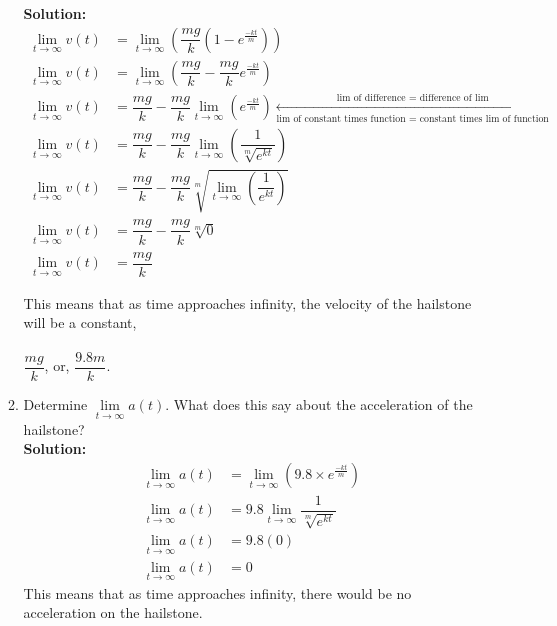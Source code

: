 \documentclass[12pt]{book}
\begin{document}
\begin{enumerate}
\begin{enumerate}
\textbf{Solution:}
\setcounter{equation}{0}
\begingroup
\addtolength{\jot}{0.5em}
\begin{align}
    \lim\limits_{t\to \infty} v(t) &= \lim\limits_{t\to \infty} \left(\dfrac{mg}{k} (1 - e^{\frac{-kt}{m}}) \right) \\
    \lim\limits_{t\to \infty} v(t) &= \lim\limits_{t\to \infty} \left( \dfrac{mg}{k} - \dfrac{mg}{k}e^{\frac{-kt}{m}} \right)\\
    \lim\limits_{t\to \infty} v(t) &=  \dfrac{mg}{k} - \dfrac{mg}{k} \lim\limits_{t\to \infty} \left(e^{\frac{-kt}{m}} \right) \xleftarrow[\text{lim of constant times function = constant times lim of function}]{\text{lim of difference = difference of lim}} \\
    \lim\limits_{t\to \infty} v(t) &=  \dfrac{mg}{k} - \dfrac{mg}{k} \lim\limits_{t\to \infty} \left(\dfrac{1}{\sqrt[m]{e^{kt}}} \right) \\
    \lim\limits_{t\to \infty} v(t) &=  \dfrac{mg}{k} - \dfrac{mg}{k} \sqrt[m]{ \lim\limits_{t\to \infty} \left(\dfrac{1}{e^{kt}} \right)  } \\
    \lim\limits_{t\to \infty} v(t) &=  \dfrac{mg}{k} - \dfrac{mg}{k} \sqrt[m]{0  } \\
    \lim\limits_{t\to \infty} v(t) &=  \dfrac{mg}{k}
\end{align}
\endgroup

This means that as time approaches infinity, the velocity of the hailstone will be a constant,\\\\ $\dfrac{mg}{k}$, or, $\dfrac{9.8m}{k}$.

\newpage

\item Determine $\lim\limits_{t\to \infty} a(t)$. What does this say about the acceleration of the hailstone?\\

\textbf{Solution:}
\setcounter{equation}{0}
\begin{align}
    \lim\limits_{t\to \infty} a(t) &= \lim\limits_{t\to \infty} \left(9.8 \times e^{\frac{-kt}{m}}\right) \\
    \lim\limits_{t\to \infty} a(t) &= 9.8 \lim\limits_{t\to \infty} \dfrac{1}{\sqrt[m]{e^{kt}}} \\
    \lim\limits_{t\to \infty} a(t) &= 9.8 (0) \\
    \lim\limits_{t\to \infty} a(t) &= 0
\end{align}
This means that as time approaches infinity, there would be no acceleration on the hailstone.


\end{enumerate}
\end{enumerate}
\end{document}
